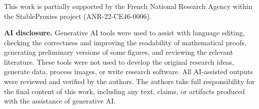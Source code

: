 \documentclass[runningheads]{llncs}
\begin{document}





\begin{credits}
  \subsubsection{\ackname}
  This work is partially supported by the French National Research
  Agency within the StableProxies project (ANR-22-CE46-0006).

  \noindent\textbf{AI disclosure.}  Generative AI tools were used to
  assist with language editing, checking the correctness and improving
  the readability of mathematical proofs, generating preliminary
  versions of some figures, and reviewing the relevant
  literature. These tools were not used to develop the original
  research ideas, generate data, process images, or write research software. All
  AI-assisted outputs were reviewed and verified by the authors. The
  authors take full responsibility for the final content of this work,
  including any text, claims, or artifacts produced with the
  assistance of generative AI.
  
\end{credits}





\appendix


\end{document}
